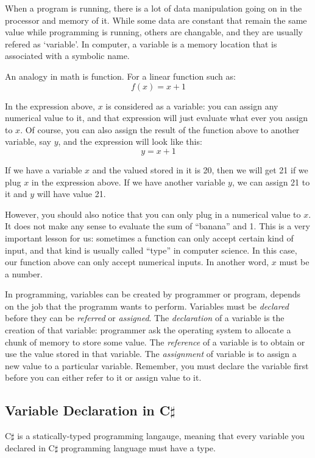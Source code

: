 \documentclass[../main.tex]{subfiles}
\begin{document}
When a program is running, there is a lot of data manipulation going on in the
processor and memory of it. While some data are constant that remain the same
value while programming is running, others are changable, and they are usually
refered as `variable'. In computer, a variable is a memory location that is
associated with a symbolic name.

An analogy in math is function. For a linear function such as:\[f(x) = x + 1\]

In the expression above, \(x\) is considered as a variable: you can assign any
numerical value to it, and that expression will just evaluate what ever you assign
to \(x\). Of course, you can also assign the result of the function above to
another variable, say \(y\), and the expression will look like this:
\[y = x + 1\]

If we have a variable \(x\) and the valued stored in it is 20, then we will get
21 if we plug \(x\) in the expression above. If we have another variable \(y\), we
can assign 21 to it and \(y\) will have value 21.

However, you should also notice that you can only plug in a numerical value to
\(x\). It does not make any sense to evaluate the sum of ``banana'' and 1. This
is a very important lesson for us: sometimes a function can only accept certain
kind of input, and that kind is usually called ``type'' in computer science. In
this case, our function above can only accept numerical inputs. In another word,
\(x\) must be a number.

In programming, variables can be created by programmer or program, depends on
the job that the programm wants to perform. Variables must be \emph{declared}
before they can be \emph{referred} or \emph{assigned}. The \emph{declaration} of
a variable is the creation of that variable: programmer ask the operating system
to allocate a chunk of memory to store some value. The \emph{reference} of a
variable is to obtain or use the value stored in that variable. The \emph{assignment}
of variable is to assign a new value to a particular variable. Remember, you must
declare the variable first before you can either refer to it or assign value
to it.

\subsection{Variable Declaration in C$\sharp$}
C$\sharp$ is a statically-typed programming langauge, meaning that every variable
you declared in C$\sharp$ programming language must have a type.
\end{document}
